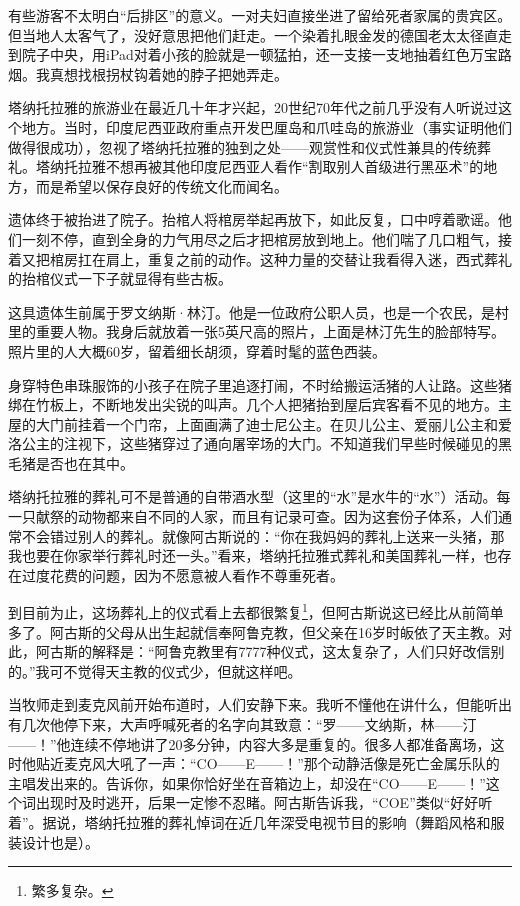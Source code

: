 \documentclass[12pt,oneside]{book}
\begin{document}
\begin{bookref}[frametitle={\cite{好好告别}}]
有些游客不太明白“后排区”的意义。一对夫妇直接坐进了留给死者家属的贵宾区。但当地人太客气了，没好意思把他们赶走。一个染着扎眼金发的德国老太太径直走到院子中央，用iPad对着小孩的脸就是一顿猛拍，还一支接一支地抽着红色万宝路烟。我真想找根拐杖钩着她的脖子把她弄走。

塔纳托拉雅的旅游业在最近几十年才兴起，20世纪70年代之前几乎没有人听说过这个地方。当时，印度尼西亚政府重点开发巴厘岛和爪哇岛的旅游业（事实证明他们做得很成功），忽视了塔纳托拉雅的独到之处——观赏性和仪式性兼具的传统葬礼。塔纳托拉雅不想再被其他印度尼西亚人看作“割取别人首级进行黑巫术”的地方，而是希望以保存良好的传统文化而闻名。

遗体终于被抬进了院子。抬棺人将棺房举起再放下，如此反复，口中哼着歌谣。他们一刻不停，直到全身的力气用尽之后才把棺房放到地上。他们喘了几口粗气，接着又把棺房扛在肩上，重复之前的动作。这种力量的交替让我看得入迷，西式葬礼的抬棺仪式一下子就显得有些古板。

这具遗体生前属于罗文纳斯·林汀。他是一位政府公职人员，也是一个农民，是村里的重要人物。我身后就放着一张5英尺高的照片，上面是林汀先生的脸部特写。照片里的人大概60岁，留着细长胡须，穿着时髦的蓝色西装。

身穿特色串珠服饰的小孩子在院子里追逐打闹，不时给搬运活猪的人让路。这些猪绑在竹板上，不断地发出尖锐的叫声。几个人把猪抬到屋后宾客看不见的地方。主屋的大门前挂着一个门帘，上面画满了迪士尼公主。在贝儿公主、爱丽儿公主和爱洛公主的注视下，这些猪穿过了通向屠宰场的大门。不知道我们早些时候碰见的黑毛猪是否也在其中。

塔纳托拉雅的葬礼可不是普通的自带酒水型（这里的“水”是水牛的“水”）活动。每一只献祭的动物都来自不同的人家，而且有记录可查。因为这套份子体系，人们通常不会错过别人的葬礼。就像阿古斯说的：“你在我妈妈的葬礼上送来一头猪，那我也要在你家举行葬礼时还一头。”看来，塔纳托拉雅式葬礼和美国葬礼一样，也存在过度花费的问题，因为不愿意被人看作不尊重死者。

到目前为止，这场葬礼上的仪式看上去都很繁复\footnote{繁多复杂。}，但阿古斯说这已经比从前简单多了。阿古斯的父母从出生起就信奉阿鲁克教，但父亲在16岁时皈依了天主教。对此，阿古斯的解释是：“阿鲁克教里有7777种仪式，这太复杂了，人们只好改信别的。”我可不觉得天主教的仪式少，但就这样吧。

当牧师走到麦克风前开始布道时，人们安静下来。我听不懂他在讲什么，但能听出有几次他停下来，大声呼喊死者的名字向其致意：“罗——文纳斯，林——汀——！”他连续不停地讲了20多分钟，内容大多是重复的。很多人都准备离场，这时他贴近麦克风大吼了一声：“CO——E——！”那个动静活像是死亡金属乐队的主唱发出来的。告诉你，如果你恰好坐在音箱边上，却没在“CO——E——！”这个词出现时及时逃开，后果一定惨不忍睹。阿古斯告诉我，“COE”类似“好好听着”。据说，塔纳托拉雅的葬礼悼词在近几年深受电视节目的影响（舞蹈风格和服装设计也是）。


\end{bookref}
\end{document}
